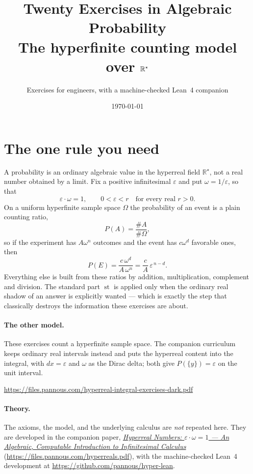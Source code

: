 \documentclass[11pt]{article}
\title{Twenty Exercises in Algebraic Probability\\
\large The hyperfinite counting model over $\Rstar$}
\author{Exercises for engineers, with a machine-checked Lean~4 companion}
\date{\today}
\newcommand{\Rstar}{\mathbb{R}^{\star}}
\newcommand{\eps}{\varepsilon}
\newcommand{\st}{\operatorname{st}}
\begin{document}
\maketitle


\section*{The one rule you need}

A probability is an ordinary algebraic value in the hyperreal field $\Rstar$,
not a real number obtained by a limit. Fix a positive infinitesimal $\eps$ and
put $\omega = 1/\eps$, so that
\[
  \eps \cdot \omega = 1,
  \qquad 0 < \eps < r \quad\text{for every real } r > 0 .
\]
On a uniform hyperfinite sample space $\Omega$ the probability of an event is a
plain counting ratio,
\[
  P(A) = \frac{\#A}{\#\Omega},
\]
so if the experiment has $A\omega^{n}$ outcomes and the event has $c\omega^{d}$
favorable ones, then
\[
  P(E) = \frac{c\,\omega^{d}}{A\,\omega^{n}} = \frac{c}{A}\,\eps^{\,n-d}.
\]
Everything else is built from these ratios by addition, multiplication,
complement and division. The standard part $\st$ is applied only when the
ordinary real shadow of an answer is explicitly wanted --- which is exactly the
step that classically destroys the information these exercises are about.

\paragraph{The other model.} These exercises count a hyperfinite sample space.
The companion curriculum keeps ordinary real intervals instead and puts the
hyperreal content into the integral, with $dx=\eps$ and $\omega$ as the Dirac
delta; both give $P(\{y\})=\eps$ on the unit interval.
\begin{center}\small\url{https://files.pannous.com/hyperreal-integral-exercises-dark.pdf}\end{center}

\paragraph{Theory.} The axioms, the model, and the underlying calculus are
\emph{not} repeated here. They are developed in the companion paper,
\href{https://files.pannous.com/hyperreals.pdf}{\emph{Hyperreal Numbers: $\eps\cdot\omega=1$ --- An
Algebraic, Computable Introduction to Infinitesimal Calculus}}
(\url{https://files.pannous.com/hyperreals.pdf}), with the machine-checked Lean~4 development at
\url{https://github.com/pannous/hyper-lean}.
\end{document}
